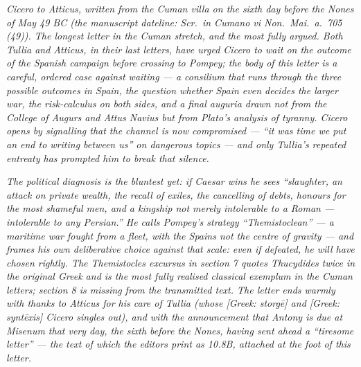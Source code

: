 
\textit{Cicero to Atticus, written from the Cuman villa
on the sixth day before the Nones of May 49 BC (the
manuscript dateline: \textit{Scr.\ in Cumano vi Non.\
Mai.\ a.\ 705 (49)}). The longest letter in the Cuman
stretch, and the most fully argued. Both Tullia and
Atticus, in their last letters, have urged Cicero to
wait on the outcome of the Spanish campaign before
crossing to Pompey; the body of this letter is a
careful, ordered case against waiting --- a
\textit{consilium} that runs through the three possible
outcomes in Spain, the question whether Spain even
decides the larger war, the risk-calculus on both
sides, and a final \textit{auguria} drawn not from the
College of Augurs and Attus Navius but from Plato's
analysis of tyranny. Cicero opens by signalling that
the channel is now compromised --- ``it was time we
put an end to writing between us'' on dangerous topics
--- and only Tullia's repeated entreaty has prompted
him to break that silence.}

\textit{The political diagnosis is the bluntest yet:
if Caesar wins he sees ``slaughter, an attack on
private wealth, the recall of exiles, the cancelling
of debts, honours for the most shameful men, and a
kingship not merely intolerable to a Roman ---
intolerable to any Persian.'' He calls Pompey's
strategy ``Themistoclean'' --- a maritime war fought
from a fleet, with the Spains not the centre of
gravity --- and frames his own deliberative choice
against that scale: even if defeated, he will have
chosen rightly. The Themistocles excursus in section 7
quotes Thucydides twice in the original Greek and is
the most fully realised classical exemplum in the
Cuman letters; section 8 is missing from the
transmitted text. The letter ends warmly with thanks
to Atticus for his care of Tullia (whose
\textit{[Greek: storg\=e]} and \textit{[Greek:
synt\=exis]} Cicero singles out), and with the
announcement that Antony is due at Misenum that very
day, the sixth before the Nones, having sent ahead a
``tiresome letter'' --- the text of which the editors
print as 10.8B, attached at the foot of this letter.}
